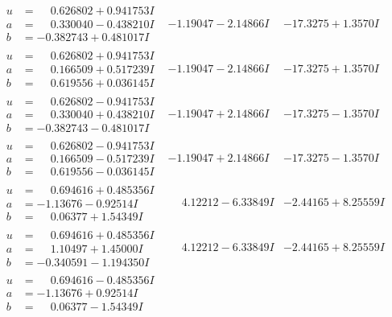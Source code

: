 \documentclass[1p]{elsarticle_modified}
\theoremstyle{definition}
\begin{document}
$$\begin{array}{c|c|c}
\begin{aligned}
u &= \phantom{-}0.626802 + 0.941753 I \\
a &= \phantom{-}0.330040 - 0.438210 I \\
b &= -0.382743 + 0.481017 I\end{aligned}
 & -1.19047 - 2.14866 I & -17.3275 + 1.3570 I \\ \hline\begin{aligned}
u &= \phantom{-}0.626802 + 0.941753 I \\
a &= \phantom{-}0.166509 + 0.517239 I \\
b &= \phantom{-}0.619556 + 0.036145 I\end{aligned}
 & -1.19047 - 2.14866 I & -17.3275 + 1.3570 I \\ \hline\begin{aligned}
u &= \phantom{-}0.626802 - 0.941753 I \\
a &= \phantom{-}0.330040 + 0.438210 I \\
b &= -0.382743 - 0.481017 I\end{aligned}
 & -1.19047 + 2.14866 I & -17.3275 - 1.3570 I \\ \hline\begin{aligned}
u &= \phantom{-}0.626802 - 0.941753 I \\
a &= \phantom{-}0.166509 - 0.517239 I \\
b &= \phantom{-}0.619556 - 0.036145 I\end{aligned}
 & -1.19047 + 2.14866 I & -17.3275 - 1.3570 I \\ \hline\begin{aligned}
u &= \phantom{-}0.694616 + 0.485356 I \\
a &= -1.13676 - 0.92514 I \\
b &= \phantom{-}0.06377 + 1.54349 I\end{aligned}
 & \phantom{-}4.12212 - 6.33849 I & -2.44165 + 8.25559 I \\ \hline\begin{aligned}
u &= \phantom{-}0.694616 + 0.485356 I \\
a &= \phantom{-}1.10497 + 1.45000 I \\
b &= -0.340591 - 1.194350 I\end{aligned}
 & \phantom{-}4.12212 - 6.33849 I & -2.44165 + 8.25559 I \\ \hline\begin{aligned}
u &= \phantom{-}0.694616 - 0.485356 I \\
a &= -1.13676 + 0.92514 I \\
b &= \phantom{-}0.06377 - 1.54349 I\end{aligned}

\end{array}$$
\end{document}
